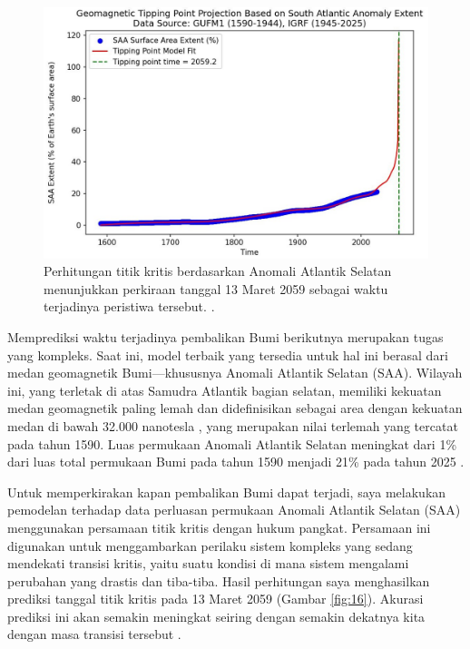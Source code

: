 \documentclass[10pt,twocolumn,letterpaper]{article}
\begin{document}
\begin{figure}[t]
\begin{center}
   \includegraphics[width=1\linewidth]{saa-crop.jpeg}
\end{center}
   \caption{Perhitungan titik kritis berdasarkan Anomali Atlantik Selatan menunjukkan perkiraan tanggal 13 Maret 2059 sebagai waktu terjadinya peristiwa tersebut. \cite{125,126}.}
\label{fig:16}
\label{fig:onecol}
\end{figure}

Memprediksi waktu terjadinya pembalikan Bumi berikutnya merupakan tugas yang kompleks. Saat ini, model terbaik yang tersedia untuk hal ini berasal dari medan geomagnetik Bumi—khususnya Anomali Atlantik Selatan (SAA). Wilayah ini, yang terletak di atas Samudra Atlantik bagian selatan, memiliki kekuatan medan geomagnetik paling lemah dan didefinisikan sebagai area dengan kekuatan medan di bawah 32.000 nanotesla \cite{135}, yang merupakan nilai terlemah yang tercatat pada tahun 1590. Luas permukaan Anomali Atlantik Selatan meningkat dari 1\% dari luas total permukaan Bumi pada tahun 1590 menjadi 21\% pada tahun 2025 \cite{136}.

Untuk memperkirakan kapan pembalikan Bumi dapat terjadi, saya melakukan pemodelan terhadap data perluasan permukaan Anomali Atlantik Selatan (SAA) menggunakan persamaan titik kritis dengan hukum pangkat. Persamaan ini digunakan untuk menggambarkan perilaku sistem kompleks yang sedang mendekati transisi kritis, yaitu suatu kondisi di mana sistem mengalami perubahan yang drastis dan tiba-tiba. Hasil perhitungan saya menghasilkan prediksi tanggal titik kritis pada 13 Maret 2059 (Gambar \ref{fig:16}). Akurasi prediksi ini akan semakin meningkat seiring dengan semakin dekatnya kita dengan masa transisi tersebut \cite{136}.
\end{document}
